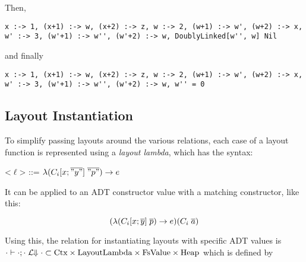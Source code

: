\documentclass[10pt]{article}
\begin{document}
Then,

\begin{lstlisting}
x :-> 1, (x+1) :-> w, (x+2) :-> z, w :-> 2, (w+1) :-> w', (w+2) :-> x, w' :-> 3, (w'+1) :-> w'', (w'+2) :-> w, DoublyLinked[w'', w] Nil
\end{lstlisting}

and finally

\begin{lstlisting}
x :-> 1, (x+1) :-> w, (x+2) :-> z, w :-> 2, (w+1) :-> w', (w+2) :-> x, w' :-> 3, (w'+1) :-> w'', (w'+2) :-> w, w'' = 0
\end{lstlisting}

\subsection{Layout Instantiation}

To simplify passing layouts around the various relations, each case of a layout function is represented using a \textit{layout lambda}, which has the
syntax:

\begin{grammar}
  <$\ell$> ::= $\lambda (C_i[x;\overline{"y"}]\; \overline{"p"}) \rightarrow e$
\end{grammar}

\noindent
It can be applied to an ADT constructor value with a matching constructor, like this:

\begin{equation*}
  (\lambda (C_i[x;\overline{y}]\; \overline{p}) \rightarrow e) (C_i\; \overline{a})
\end{equation*}

\noindent
Using this, the relation for instantiating layouts with specific ADT values is
$\cdot \vdash \cdot; \cdot\;\mathcal{L}\!\!\Downarrow\cdot \subset \textnormal{Ctx} \times \textnormal{LayoutLambda} \times \textnormal{FsValue} \times \textnormal{Heap}$ which is defined by
\end{document}
